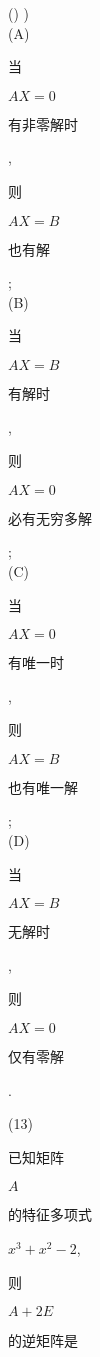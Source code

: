 \documentclass[10pt]{article}
\begin{document}
() )\\
(A) \begin{CJK}{UTF8}{mj}当\end{CJK} $A X=0$ \begin{CJK}{UTF8}{mj}有非零解时\end{CJK}, \begin{CJK}{UTF8}{mj}则\end{CJK} $A X=B$ \begin{CJK}{UTF8}{mj}也有解\end{CJK};\\
(B) \begin{CJK}{UTF8}{mj}当\end{CJK} $A X=B$ \begin{CJK}{UTF8}{mj}有解时\end{CJK}, \begin{CJK}{UTF8}{mj}则\end{CJK} $A X=0$ \begin{CJK}{UTF8}{mj}必有无穷多解\end{CJK};\\
(C) \begin{CJK}{UTF8}{mj}当\end{CJK} $A X=0$ \begin{CJK}{UTF8}{mj}有唯一时\end{CJK}, \begin{CJK}{UTF8}{mj}则\end{CJK} $A X=B$ \begin{CJK}{UTF8}{mj}也有唯一解\end{CJK};\\
(D) \begin{CJK}{UTF8}{mj}当\end{CJK} $A X=B$ \begin{CJK}{UTF8}{mj}无解时\end{CJK}, \begin{CJK}{UTF8}{mj}则\end{CJK} $A X=0$ \begin{CJK}{UTF8}{mj}仅有零解\end{CJK}.

(13) \begin{CJK}{UTF8}{mj}已知矩阵\end{CJK} $A$ \begin{CJK}{UTF8}{mj}的特征多项式\end{CJK} $x^{3}+x^{2}-2$, \begin{CJK}{UTF8}{mj}则\end{CJK} $A+2 E$ \begin{CJK}{UTF8}{mj}的逆矩阵是\end{CJK}
\end{document}
